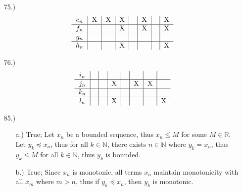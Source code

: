 \documentclass[12pt]{article}
\begin{document}
\begin{itemize}
    \item [75.)] 
    \[
    \begin{tabular}{c|c|c|c|c|c|c|c}
        $e_n$ & X & X & X & & X & & X \\
        \hline
        $f_n$ & & & X & & X & & X \\
        \hline
        $g_n$ & & & & & & & \\
        \hline
        $h_n$ & & & X & & & & X\\
    \end{tabular}
    \]

    \item [76.)]
    \[
    \begin{tabular}{c|c|c|c|c|c|c|c}
        $i_n$ & & & & & & & \\
        \hline
        $j_n$ & & & X & & X & X \\
        \hline
        $k_n$ & & & & & & & \\
        \hline
        $l_n$ & & & X & & & & X \\
    \end{tabular}
    \]

    \item [85.)] \begin{itemize}
        \item [a.)] True; Let $x_n$ be a bounded sequence, thus $x_n\leq M$ for some $M\in\mathbb{R}$. Let $y_k\preceq x_n$, thus for all $k\in\mathbb{N}$, there exists $n\in\mathbb{N}$ where $y_k=x_n$, thus $y_k\leq M$ for all $k\in\mathbb{N}$, thus $y_k$ is bounded.

        \item [b.)] True; Since $x_n$ is monotonic, all terms $x_n$ maintain monotonicity with all $x_m$ where $m>n$, thus if $y_k\preceq x_n$, then $y_k$ is monotonic.
    \end{itemize}






\end{itemize}
\end{document}
